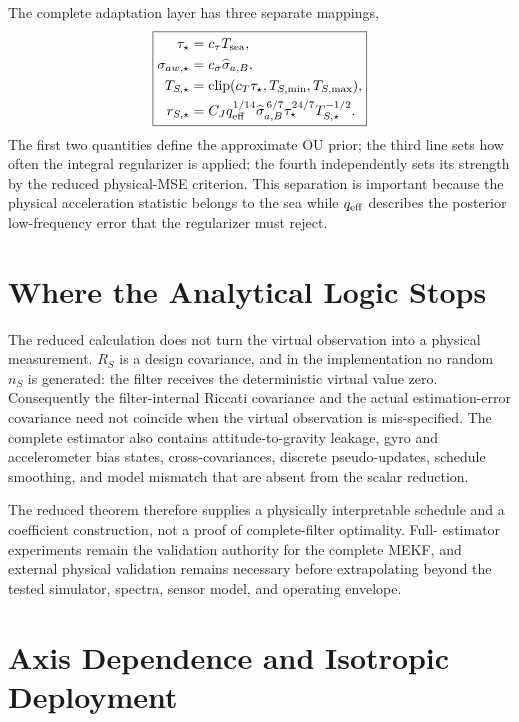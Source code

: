\documentclass[conference]{IEEEtran}
\DeclareMathOperator{\clip}{clip}
\theoremstyle{remark}
\begin{document}
The complete adaptation layer has three separate mappings,
\begin{equation}
\boxed{
\begin{aligned}
\tau_\star&=c_\tau T_{\rm sea},\\
\sigma_{aw,\star}&=c_\sigma\widehat\sigma_{a,B},\\
T_{S,\star}&=\clip(c_T\tau_\star,T_{S,\min},T_{S,\max}),\\
r_{S,\star}&=C_J q_{\rm eff}^{1/14}
 \widehat\sigma_{a,B}^{\,6/7}
 \tau_\star^{24/7}T_{S,\star}^{-1/2}.
\end{aligned}}
\label{eq:current-schedule}
\end{equation}
The first two quantities define the approximate OU prior; the third line sets
how often the integral regularizer is applied; the fourth independently sets
its strength by the reduced physical-MSE criterion.  This separation is
important because the physical acceleration statistic belongs to the sea while
$q_{\rm eff}$ describes the posterior low-frequency error that the regularizer
must reject.

\section{Where the Analytical Logic Stops}
\label{sec:limits}

The reduced calculation does not turn the virtual observation into a physical
measurement.  $R_S$ is a design covariance, and in the implementation no random
$n_S$ is generated: the filter receives the deterministic virtual value zero.
Consequently the filter-internal Riccati covariance and the actual
estimation-error covariance need not coincide when the virtual observation is
mis-specified.  The complete estimator also contains attitude-to-gravity
leakage, gyro and accelerometer bias states, cross-covariances, discrete
pseudo-updates, schedule smoothing, and model mismatch that are absent from the
scalar reduction.

The reduced theorem therefore supplies a physically interpretable schedule and
a coefficient construction, not a proof of complete-filter optimality.  Full-
estimator experiments remain the validation authority for the complete MEKF,
and external physical validation remains necessary before extrapolating beyond
the tested simulator, spectra, sensor model, and operating envelope.

\section{Axis Dependence and Isotropic Deployment}
\label{sec:axes}
\end{document}

